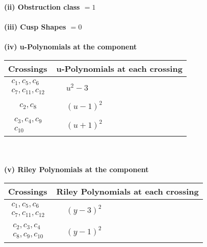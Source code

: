 \documentclass[1p]{elsarticle_modified}
\theoremstyle{definition}
\begin{document}
\flushleft \textbf{(ii) Obstruction class $= 1$}\\~\\
\flushleft \textbf{(iii) Cusp Shapes $= 0$}\\~\\
\newpage\renewcommand{\arraystretch}{1}
\flushleft \textbf{(iv) u-Polynomials at the component}\newline \\
\begin{tabular}{m{50pt}|m{274pt}}
Crossings & \hspace{64pt}u-Polynomials at each crossing \\
\hline $$\begin{aligned}c_{1},c_{5},c_{6}\\c_{7},c_{11},c_{12}\end{aligned}$$&$\begin{aligned}
&u^2-3
\end{aligned}$\\
\hline $$\begin{aligned}c_{2},c_{8}\end{aligned}$$&$\begin{aligned}
&(u-1)^2
\end{aligned}$\\
\hline $$\begin{aligned}c_{3},c_{4},c_{9}\\c_{10}\end{aligned}$$&$\begin{aligned}
&(u+1)^2
\end{aligned}$\\
\hline
\end{tabular}\\~\\
\newpage\renewcommand{\arraystretch}{1}
\flushleft \textbf{(v) Riley Polynomials at the component}\newline \\
\begin{tabular}{m{50pt}|m{274pt}}
Crossings & \hspace{64pt}Riley Polynomials at each crossing \\
\hline $$\begin{aligned}c_{1},c_{5},c_{6}\\c_{7},c_{11},c_{12}\end{aligned}$$&$\begin{aligned}
&(y-3)^2
\end{aligned}$\\
\hline $$\begin{aligned}c_{2},c_{3},c_{4}\\c_{8},c_{9},c_{10}\end{aligned}$$&$\begin{aligned}
&(y-1)^2
\end{aligned}$\\
\hline
\end{tabular}\\~\\
\end{document}
